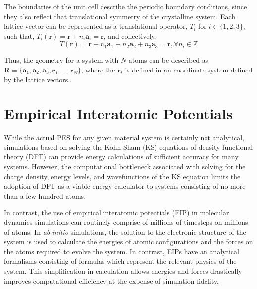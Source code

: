 The boundaries of the unit cell describe the periodic boundary conditions, since they also reflect that translational symmetry of the crystalline system.
Each lattice vector can be represented as a translational operator, $T_i$ for ${i\in\{1,2,3\}}$, such that, $T_i(\bm{r})=\bm{r} + n_i \bm{a}_i = \bm{r}$, and collectively,
\begin{equation}
    T(\bm{r}) = \bm{r}
		    + n_1 \bm{a}_1
		    + n_2 \bm{a}_2
		    + n_3 \bm{a}_3 = \bm{r}, \forall n_i \in \mathbb{Z}
\end{equation}

Thus, the geometry for a system with $N$ atoms can be described as
	$\bm{R} = \{\bm{a}_1,\bm{a}_2,\bm{a}_3,\bm{r}_1,...,\bm{r}_N\}$,
	where the $\bm{r}_i$ is defined in an coordinate system defined by the lattice vectors..

\section{Empirical Interatomic Potentials}

While the actual PES for any given material system is certainly not analytical, simulations based on solving the Kohn-Sham (KS) equations\cite{kohn1965_dft} of density functional theory (DFT)\cite{hohenberg1964_dft} can provide energy calculations of sufficient accuracy for many systems.  However, the computational bottleneck associated with solving for the charge density, energy levels, and wavefunctions of the KS equation limits the adoption of DFT as a viable energy calculator to systems consisting of no more than a few hundred atoms.

In contrast, the use of empirical interatomic potentials (EIP) in molecular dynamics simulations can routinely comprise of millions of timesteps on millions of atoms.  In \emph{ab initio} simulations, the solution to the electronic structure of the system is used to calculate the energies of atomic configurations and the forces on the atoms required to evolve the system. In contrast, EIPs have an analytical formalisms consisting of formulas which represent the relevant physics of the system.  This simplification in calculation allows energies and forces drastically improves computational efficiency at the expense of simulation fidelity.

